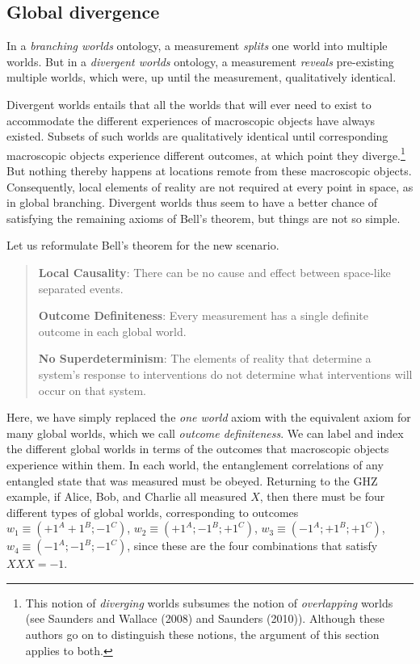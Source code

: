 \documentclass[12pt]{article}
\begin{document}
\subsection{Global divergence} \label{sec:GlobDiv}

 In a \textit{branching worlds} ontology, a measurement \textit{splits} one world into multiple worlds. But in a \textit{divergent worlds} ontology, a measurement \textit{reveals} pre-existing multiple worlds, which were, up until the measurement, qualitatively identical. 
 
 Divergent worlds entails that all the worlds that will ever need to exist to accommodate the different experiences of macroscopic objects have always existed. Subsets of such worlds are qualitatively identical until corresponding macroscopic objects experience different outcomes, at which point they diverge.\footnote{This notion of \textit{diverging} worlds subsumes the notion of \textit{overlapping} worlds (see Saunders and Wallace (2008) and Saunders (2010)). Although these authors go on to distinguish these notions, the argument of this section applies to both.} But nothing thereby happens at locations remote from these macroscopic objects. Consequently, local elements of reality are not required at every point in space, as in global branching. Divergent worlds thus seem to have a better chance of satisfying the remaining axioms of Bell’s theorem, but things are not so simple. 

Let us reformulate Bell’s theorem for the new
scenario.

\begin{quote}
\textbf{Local Causality}: There can be no cause and effect between space-like separated events.

\textbf{Outcome Definiteness}: Every measurement has a single definite outcome in each global world.

\textbf{No Superdeterminism}: The elements of reality that determine a system's response to interventions do not determine what interventions will occur on that system.
\end{quote}

Here, we have simply replaced the \textit{one world} axiom with the equivalent axiom for many global worlds, which we call \textit{outcome definiteness}. We can label and index the different global worlds in terms of the outcomes that macroscopic objects experience
within them. In each world, the entanglement correlations of any entangled state that was measured must be obeyed. Returning to the GHZ example, if Alice, Bob, and Charlie all measured $X$, then there must be four different types of global worlds, corresponding to outcomes $w_1 \equiv (+1^A +1^B;-1^C)$,
$w_2 \equiv (+1^A;-1^B;+1^C)$, $w_3 \equiv (-1^A;+1^B;+1^C)$, $w_4 \equiv (-1^A;-1^B;-1^C)$, since these are the four combinations that satisfy $XXX = -1$.
\end{document}
